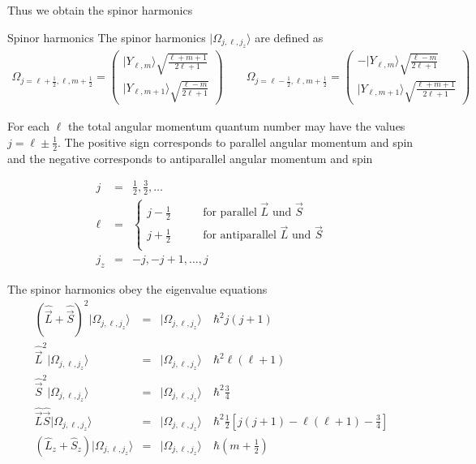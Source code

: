 \documentclass[11pt,a4paper]{report}
\begin{document}
Thus we obtain the spinor harmonics
\begin{myshadowminipage}{Spinor harmonics}
The spinor harmonics $|\Omega_{j,\ell,j_z}\rangle$ are defined as
\begin{eqnarray}
\Omega_{j=\ell+\frac{1}{2},\ell,m+\frac{1}{2}}=\left(
\begin{array}{c}
|Y_{\ell,m}\rangle\sqrt{\frac{\ell+m+1}{2\ell+1}}\\
|Y_{\ell,m+1}\rangle\sqrt{\frac{\ell-m}{2\ell+1}}\end{array}\right)
\qquad
\Omega_{j=\ell-\frac{1}{2},\ell,m+\frac{1}{2}}=\left(
\begin{array}{c}
-|Y_{\ell,m}\rangle\sqrt{\frac{\ell-m}{2\ell+1}}\\
|Y_{\ell,m+1}\rangle\sqrt{\frac{\ell+m+1}{2\ell+1}}\end{array}\right)
\label{eq:defspinorharmonics1}
\end{eqnarray}

For each $\ell$ the total angular momentum quantum number may have the
values $j=\ell\pm\frac{1}{2}$. The positive sign corresponds to
parallel angular momentum and spin and the negative corresponds to
antiparallel angular momentum and spin

\begin{eqnarray*}
j&=&\frac{1}{2},\frac{3}{2},\ldots
\\
\ell&=&\left\lbrace\begin{array}{cc}
j-\frac{1}{2}&\qquad\text{for parallel $\vec{L}$ und $\vec{S}$}\\
j+\frac{1}{2}&\qquad\text{for antiparallel $\vec{L}$ und $\vec{S}$}\\
\end{array}\right.
\\
j_z&=&-j,-j+1,\ldots,j
\end{eqnarray*}

The spinor harmonics obey the eigenvalue equations
\begin{eqnarray*}
\left(\hat{\vec{L}}+\hat{\vec{S}}\right)^2|\Omega_{j,\ell,j_z}\rangle
&=&|\Omega_{j,\ell,j_z}\rangle\quad\hbar^2j(j+1)
\\
\hat{\vec{L}}^2|\Omega_{j,\ell,j_z}\rangle
&=&|\Omega_{j,\ell,j_z}\rangle\quad\hbar^2\ell(\ell+1)
\\
\hat{\vec{S}}^2|\Omega_{j,\ell,j_z}\rangle
&=&|\Omega_{j,\ell,j_z}\rangle\quad\hbar^2\frac{3}{4}
\\
\hat{\vec{L}}\hat{\vec{S}}|\Omega_{j,\ell,j_z}\rangle
&=&|\Omega_{j,\ell,j_z}\rangle\quad
\hbar^2\frac{1}{2}\left[j(j+1)-\ell(\ell+1)-\frac{3}{4}\right]
\\
\left(\hat{L}_z+\hat{S}_z\right)|\Omega_{j,\ell,j_z}\rangle
&=&|\Omega_{j,\ell,j_z}\rangle\quad\hbar(m+\frac{1}{2})
\end{eqnarray*}


\end{myshadowminipage}
\end{document}
